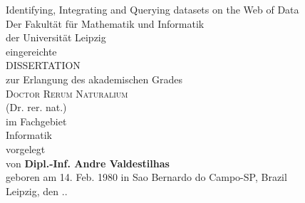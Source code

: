 \documentclass[a4paper,twoside,abstracton,12pt,BCOR=15mm]{scrreprt}
\begin{document}
\renewcommand{\thepage}{\Roman{page}}

\begin{titlepage}

\begin{center}
\large

$\quad$\\
$\quad$\\
{\Huge Identifying, Integrating and Querying datasets on the Web of Data}\\
\vspace{1cm}
Der Fakult\"at f\"ur Mathematik und Informatik\\
der Universit\"at Leipzig\\
eingereichte\\
\vspace{1cm}
{\Huge DISSERTATION}\\
\vspace{1cm}
zur Erlangung des akademischen Grades\\
\vspace{1cm}
{\Large \scshape{Doctor Rerum Naturalium}}\\
(Dr. rer. nat.)\\
\vspace{1cm}
im Fachgebiet\\
{\large Informatik}\\
\vspace{1cm}
vorgelegt\\
\vspace{1cm}
{von \textbf{Dipl.-Inf. Andre Valdestilhas}}\\
\vspace{1cm}
geboren am 14. Feb. 1980 in Sao Bernardo do Campo-SP, Brazil\\
\vspace{1cm}
Leipzig, den \the\day.\the\month.\the\year

\vfill

\end{center}
\cleardoublepage
\end{titlepage}

\tableofcontents
\newpage
\begingroup 
    \let\clearpage\relax
    \let\cleardoublepage\relax
    \let\cleardoublepage\relax
\end{document}

